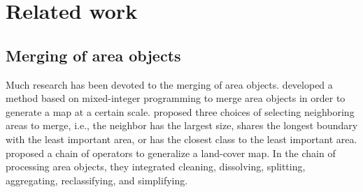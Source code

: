 \documentclass{ica}
\begin{document}










\section{Related work}
\label{sec:realted_work}





\subsection{Merging of area objects}
Much research has been devoted to the merging of area objects.
\citet{HaunertWolff2010AreaAgg} developed a method based on
mixed-integer programming to merge area objects
in order to generate a map at a certain scale.
\citet{Cheng2006} proposed three choices of 
selecting neighboring areas to merge, i.e.,
the neighbor has the largest size, 
shares the longest boundary with the least important area,
or has the closest class to the least important area.
\citet{Thiemann2018LandCover} proposed a chain of operators 
to generalize a land-cover map.
In the chain of processing area objects, 
they integrated cleaning, dissolving, splitting, 
aggregating, reclassifying, and simplifying. 
\end{document}
